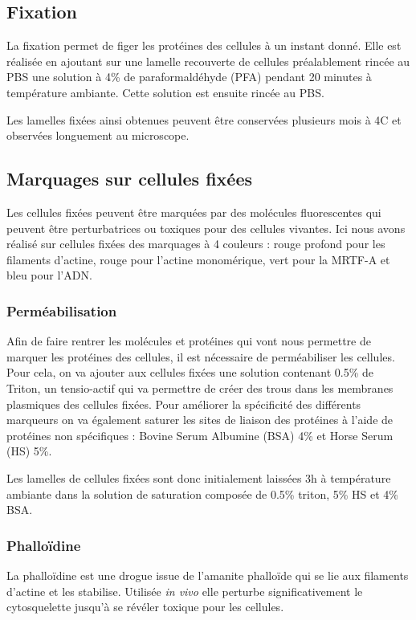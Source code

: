 \documentclass{report}
\begin{document}
	\subsection{Fixation}
	La fixation permet de figer les protéines des cellules à un instant donné. Elle est réalisée en ajoutant sur une lamelle recouverte de cellules préalablement rincée au PBS une solution à 4\% de paraformaldéhyde (PFA) pendant 20 minutes à température ambiante. Cette solution est ensuite rincée au PBS. 
	
	Les lamelles fixées ainsi obtenues peuvent être conservées plusieurs mois à 4\degres   C et observées longuement au microscope. 
	\subsection{Marquages sur cellules fixées}
	Les cellules fixées peuvent être marquées par des molécules fluorescentes qui peuvent être perturbatrices ou toxiques pour des cellules vivantes. Ici nous avons réalisé sur cellules fixées des marquages à 4 couleurs : rouge profond pour les filaments d'actine, rouge pour l'actine monomérique, vert pour la MRTF-A et bleu pour l'ADN. 
		\subsubsection{Perméabilisation}
		Afin de faire rentrer les molécules et protéines qui vont nous permettre de marquer les protéines des cellules, il est nécessaire de perméabiliser les cellules. Pour cela, on va ajouter aux cellules fixées une solution contenant 0.5\% de Triton, un tensio-actif qui va permettre de créer des trous dans les membranes plasmiques des cellules fixées. 
		Pour améliorer la spécificité des différents marqueurs on va également saturer les sites de liaison des protéines à l'aide de protéines non spécifiques : Bovine Serum Albumine (BSA) 4\% et Horse Serum (HS) 5\%. 
		
		Les lamelles de cellules fixées sont donc initialement laissées 3h à température ambiante dans la solution de saturation composée de 0.5\% triton, 5\% HS et 4\% BSA. 
		
		\subsubsection{Phalloïdine}
		La phalloïdine est une drogue issue de l'amanite phalloïde qui se lie aux filaments d'actine et les stabilise. Utilisée \emph{in vivo} elle perturbe significativement le cytosquelette jusqu'à se révéler toxique pour les cellules. 
		
\end{document}

